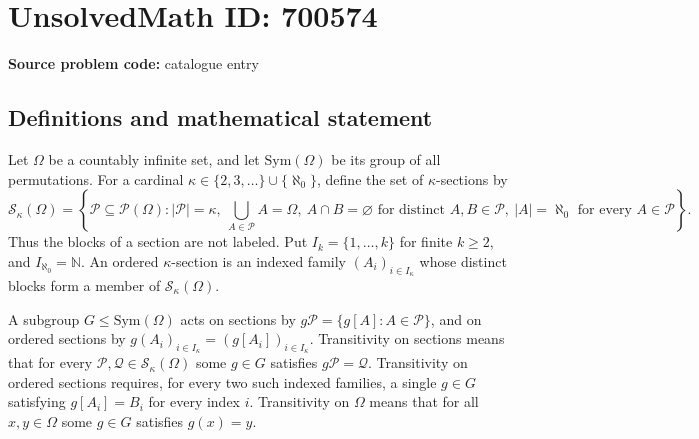 \documentclass[11pt]{article}
\newcommand{\N}{\mathbb{N}}
\begin{document}
\section*{UnsolvedMath ID: 700574}
\textbf{Source problem code:} catalogue entry
\subsection{Definitions and mathematical statement}
Let \(\Omega\) be a countably infinite set, and let \(\mathrm{Sym}(\Omega)\) be its group of all permutations. For a cardinal \(\kappa\in\{2,3,\ldots\}\cup\{\aleph_0\}\), define the set of \(\kappa\)-sections by
\[
\mathcal S_\kappa(\Omega)=\left\{\mathcal P\subseteq\mathcal P(\Omega): |\mathcal P|=\kappa,\ \bigcup_{A\in\mathcal P}A=\Omega,\ A\cap B=\varnothing\text{ for distinct }A,B\in\mathcal P,\ |A|=\aleph_0\text{ for every }A\in\mathcal P\right\}.
\]
Thus the blocks of a section are not labeled. Put \(I_k=\{1,\ldots,k\}\) for finite \(k\geq2\), and \(I_{\aleph_0}=\N\). An ordered \(\kappa\)-section is an indexed family \((A_i)_{i\in I_\kappa}\) whose distinct blocks form a member of \(\mathcal S_\kappa(\Omega)\).

A subgroup \(G\leq\mathrm{Sym}(\Omega)\) acts on sections by \(g\mathcal P=\{g[A]:A\in\mathcal P\}\), and on ordered sections by \(g(A_i)_{i\in I_\kappa}=(g[A_i])_{i\in I_\kappa}\). Transitivity on sections means that for every \(\mathcal P,\mathcal Q\in\mathcal S_\kappa(\Omega)\) some \(g\in G\) satisfies \(g\mathcal P=\mathcal Q\). Transitivity on ordered sections requires, for every two such indexed families, a single \(g\in G\) satisfying \(g[A_i]=B_i\) for every index \(i\). Transitivity on \(\Omega\) means that for all \(x,y\in\Omega\) some \(g\in G\) satisfies \(g(x)=y\).
\end{document}

